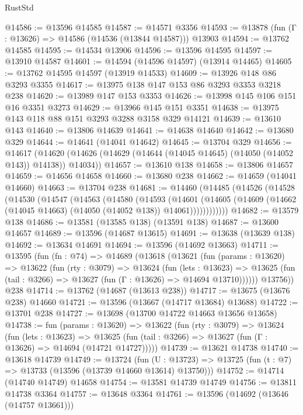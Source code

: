 \begin{lexlean}{RustStd}
\begin{coremodule}
{\begin{coremodule}
{{{{{{{{{{{{{{{{{{{{{{{{{{{{{{{{{{{{{{{@14586 := @13596 @14585
@14587 := @14571 @3356
@14593 := @13878 (fun (Γ : @13626) => @14586 (@14536 (@13844 @14587))) @13903
@14594 := @13762 @14585
@14595 := @14534 @13906
@14596 := @13596 @14595
@14597 := @13910 @14587
@14601 := @14594 (@14596 @14597) (@13914 @14465)
@14605 := @13762 @14595 @14597 (@13919 @14533)
@14609 := @13926 @148 @86 @3293 @3355
@14617 := @13975 @138 @147 @153 @86 @3293 @3353 @3218 @238
@14620 := @13989 @147 @153 @3353
@14626 := @13998 @145 @106 @151 @16 @3351 @3273
@14629 := @13966 @145 @151 @3351
@14638 := @13975 @143 @118 @88 @151 @3293 @3288 @3158 @329 @14121
@14639 := @13610 @143
@14640 := @13806 @14639
@14641 := @14638 @14640
@14642 := @13680 @329
@14644 := @14641 (@14041 @14642)
@14645 := @13704 @329
@14656 := @14617
    (@14620 (@14626 (@14629 (@14644 (@14045 @14645) (@14050 (@14052 @143)) @14138)) @14034))
@14657 := @13610 @138
@14658 := @13806 @14657
@14659 := @14656 @14658
@14660 := @13680 @238
@14662 := @14659 (@14041 @14660)
@14663 := @13704 @238
@14681 := @14460
    (@14485
      (@14526
        (@14528
          (@14530
            (@14547
              (@14563
                (@14580
                  (@14593
                    (@14601
                      (@14605
                        (@14609 (@14662 (@14045 @14663) (@14050 (@14052 @138)) @14061))))))))))))
@14682 := @13579 @138
@14686 := @13581 (@13585 @138) (@13591 @138)
@14687 := @13600 @14657
@14689 := @13596 (@14687 @13615)
@14691 := @13638 (@13639 @138)
@14692 := @13634 @14691
@14694 := @13596 (@14692 @13663)
@14711 := @13595
    (fun (fn : @74) =>
    @14689
      (@13618
        (@13621
          (fun (params : @13620) =>
          @13622
            (fun (rty : @3079) =>
            @13624
              (fun (lets : @13623) =>
              @13625 (fun (tail : @3266) => @13627 (fun (Γ : @13626) => @14694 @13710))))))
        @13756))
    @238
@14714 := @13762 (@14687 (@13613 @238))
@14717 := @13675 (@13676 @238) @14660
@14721 := @13596 (@13667 (@14717 @13684) @13688)
@14722 := @13701 @238
@14727 := @13698 (@13700 @14722 @14663 @13656 @13658)
@14738 := fun (params : @13620) =>
  @13622
    (fun (rty : @3079) =>
    @13624
      (fun (lets : @13623) =>
      @13625 (fun (tail : @3266) => @13627 (fun (Γ : @13626) => @14694 (@14721 @14727)))))
@14739 := @13621 @14738
@14740 := @13618 @14739
@14749 := @13724
    (fun (U : @13723) => @13725 (fun (t : @7) => @13733 (@13596 (@13739 @14660 @13614) @13750)))
@14752 := @14714 (@14740 @14749) @14658
@14754 := @13581 @14739 @14749
@14756 := @13811 @14738 @3364
@14757 := @13648 @3364
@14761 := @13596 (@14692 (@13646 (@14757 @13661)))
}}}}}}}}}}}}}}}}}}}}}}}}}}}}}}}}}}}}}}}
\end{coremodule}}
\end{coremodule}
\end{lexlean}
